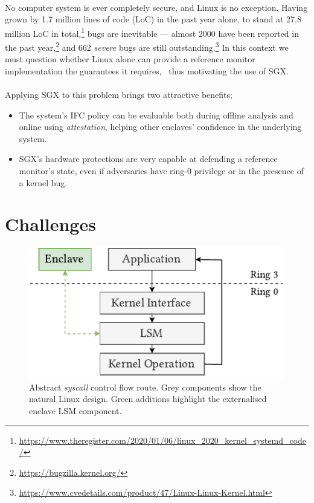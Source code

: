 \paragraph{} No computer system is ever completely secure, and Linux is no exception. Having grown by 1.7 million lines of code (LoC) in the past year alone, to stand at 27.8 million LoC in total,\footnote{\url{https://www.theregister.com/2020/01/06/linux\_2020\_kernel\_systemd\_code/}} bugs are inevitable --- almost 2000 have been reported in the past year,\footnote{\url{https://bugzilla.kernel.org/}} and 662 \textit{severe} bugs are still outstanding.\footnote{\url{https://www.cvedetails.com/product/47/Linux-Linux-Kernel.html}} In this context we must question whether Linux alone can provide a reference monitor implementation the guarantees it requires,~\cite{Lipp2018MeltdownRK, 10.5555/2831143.2831164} thus motivating the use of SGX.

\paragraph{} Applying SGX to this problem brings two attractive benefits;
\begin{itemize}
    \item The system's IFC policy can be evaluable both during offline analysis and online using \textit{attestation}, helping other enclaves' confidence in the underlying system.
    \item SGX's hardware protections are very capable at defending a reference monitor's state, even if adversaries have ring-0 privilege or in the presence of a kernel bug.
\end{itemize}

\section{Challenges}

\begin{figure}[]
    \centering
    \includegraphics[width=0.48\linewidth]{figures/SGX-EnclaveIntegration.pdf}
    \caption{Abstract \textit{syscall} control flow route. Grey components show the natural Linux design. Green additions highlight the externalised enclave LSM component.}
    \vspace{5mm}
    \label{fig:sgx-abstract-integration}
\end{figure}

